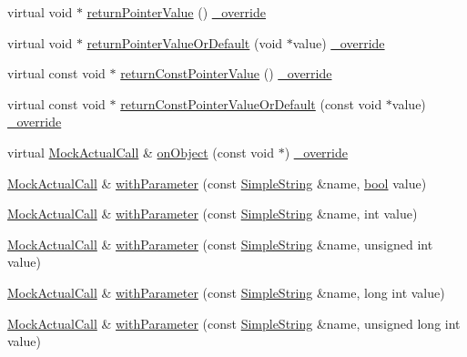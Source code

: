 \begin{DoxyCompactItemize}
\item 
virtual void $\ast$ \hyperlink{class_mock_ignored_actual_call_a53ccf38dd11f2d05a53181b5ac0ee5fc}{return\+Pointer\+Value} () \hyperlink{_cpp_u_test_config_8h_a049bea15dd750e15869863c94c1efc3b}{\+\_\+override}
\item 
virtual void $\ast$ \hyperlink{class_mock_ignored_actual_call_a562dd71173d900f00477e90d703935b3}{return\+Pointer\+Value\+Or\+Default} (void $\ast$value) \hyperlink{_cpp_u_test_config_8h_a049bea15dd750e15869863c94c1efc3b}{\+\_\+override}
\item 
virtual const void $\ast$ \hyperlink{class_mock_ignored_actual_call_ade3986d9e44a54116cf01c1e37d4420c}{return\+Const\+Pointer\+Value} () \hyperlink{_cpp_u_test_config_8h_a049bea15dd750e15869863c94c1efc3b}{\+\_\+override}
\item 
virtual const void $\ast$ \hyperlink{class_mock_ignored_actual_call_ab4ee195df269a88c1267af228ad56c0c}{return\+Const\+Pointer\+Value\+Or\+Default} (const void $\ast$value) \hyperlink{_cpp_u_test_config_8h_a049bea15dd750e15869863c94c1efc3b}{\+\_\+override}
\item 
virtual \hyperlink{class_mock_actual_call}{Mock\+Actual\+Call} \& \hyperlink{class_mock_ignored_actual_call_afb05f7848eeb0fb7bbdd803fa6abfed5}{on\+Object} (const void $\ast$) \hyperlink{_cpp_u_test_config_8h_a049bea15dd750e15869863c94c1efc3b}{\+\_\+override}
\item 
\hyperlink{class_mock_actual_call}{Mock\+Actual\+Call} \& \hyperlink{class_mock_actual_call_a158f3ada8f73127b977d5353d4e4dea0}{with\+Parameter} (const \hyperlink{class_simple_string}{Simple\+String} \&name, \hyperlink{avb__gptp_8h_af6a258d8f3ee5206d682d799316314b1}{bool} value)
\item 
\hyperlink{class_mock_actual_call}{Mock\+Actual\+Call} \& \hyperlink{class_mock_actual_call_abec25d19fe41e8acb31af0130704aa6b}{with\+Parameter} (const \hyperlink{class_simple_string}{Simple\+String} \&name, int value)
\item 
\hyperlink{class_mock_actual_call}{Mock\+Actual\+Call} \& \hyperlink{class_mock_actual_call_ae18a228b6f5e0260c239a22fd94c2353}{with\+Parameter} (const \hyperlink{class_simple_string}{Simple\+String} \&name, unsigned int value)
\item 
\hyperlink{class_mock_actual_call}{Mock\+Actual\+Call} \& \hyperlink{class_mock_actual_call_ac481a5b2a6c2b48d081b88d514f94332}{with\+Parameter} (const \hyperlink{class_simple_string}{Simple\+String} \&name, long int value)
\item 
\hyperlink{class_mock_actual_call}{Mock\+Actual\+Call} \& \hyperlink{class_mock_actual_call_aeb2eccd3b3b4d5820e35401d6daec7b2}{with\+Parameter} (const \hyperlink{class_simple_string}{Simple\+String} \&name, unsigned long int value)

\end{DoxyCompactItemize}
